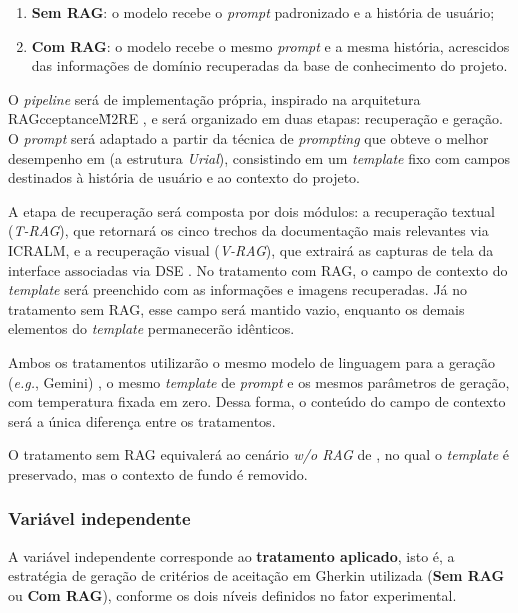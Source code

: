 \begin{enumerate} 
    \item \textbf{Sem RAG}: o modelo recebe o \textit{prompt} padronizado e a história de usuário; 
    \item \textbf{Com RAG}: o modelo recebe o mesmo \textit{prompt} e a mesma história, acrescidos das informações de domínio recuperadas da base de conhecimento do projeto. 
\end{enumerate}

O \textit{pipeline} será de implementação própria, inspirado na arquitetura RAGcceptance\~M2RE \cite{wang2025}, e será organizado em duas etapas: recuperação e geração. O \textit{prompt} será adaptado a partir da técnica de \textit{prompting} que obteve o melhor desempenho em  (a estrutura \textit{Urial}), consistindo em um \textit{template} fixo com campos destinados à história de usuário e ao contexto do projeto.

A etapa de recuperação será composta por dois módulos: a recuperação textual (\textit{T-RAG}), que retornará os cinco trechos da documentação mais relevantes via ICRALM, e a recuperação visual (\textit{V-RAG}), que extrairá as capturas de tela da interface associadas via DSE \cite{wang2025}. No tratamento com RAG, o campo de contexto do \textit{template} será preenchido com as informações e imagens recuperadas. Já no tratamento sem RAG, esse campo será mantido vazio, enquanto os demais elementos do \textit{template} permanecerão idênticos.

Ambos os tratamentos utilizarão o mesmo modelo de linguagem para a geração (\textit{e.g.}, Gemini) \cite{wang2025}, o mesmo \textit{template} de \textit{prompt} e os mesmos parâmetros de geração, com temperatura fixada em zero. Dessa forma, o conteúdo do campo de contexto será a única diferença entre os tratamentos.

O tratamento sem RAG equivalerá ao cenário \textit{w/o RAG} de , no qual o \textit{template} é preservado, mas o contexto de fundo é removido.

\subsubsection*{Variável independente}
A variável independente corresponde ao \textbf{tratamento aplicado}, isto é, a estratégia de geração de critérios de aceitação em Gherkin utilizada (\textbf{Sem RAG} ou \textbf{Com RAG}), conforme os dois níveis definidos no fator experimental.

